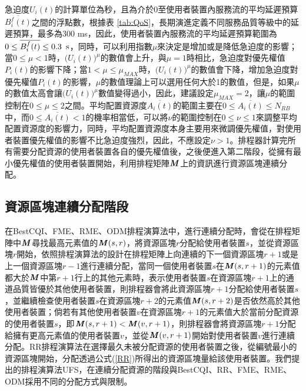急迫度$U_i(t)$的計算單位為秒，且為介於0至使用者裝置內服務流的平均延遲預算$\overline{B_i^f(t)}$之間的浮點數，根據表 \ref{tab:QoS}，長期演進定義不同服務品質等級中的延遲預算，最多為300 ms，因此，使用者裝置內服務流的平均延遲預算範圍為$0 \leq \overline{B_i^f(t)} \leq 0.3\enskip\text{s}$，同時，可以利用指數$\mu$來決定是增加或是降低急迫度的影響；當$0\leq\mu< 1$時，$\big(U_i(t)\big)^\mu$的數值會上升，與$\mu=1$時相比，急迫度對優先權值$P_i(t)$的影響下降；當$1<\mu\leq \mu_{MAX}$時，$\big(U_i(t)\big)^\mu$的數值會下降，增加急迫度對優先權值$P_i(t)$的影響，$\mu$的數值理論上可以選用任何大於1的數值，但是，如果$\mu$的數值太高會讓$\big(U_i(t)\big)^\mu$數值變得過小，因此，建議設定$\mu_{MAX}=2$，讓$\mu$的範圍控制在$0\leq\mu\leq 2$之間。平均配置資源度$\overline{A_i(t)}$的範圍主要在$0\leq\overline{A_i(t)}\leq N_{RB}$中，而$0\leq\overline{A_i(t)}<1$的機率相當低，可以將$\nu$的範圍控制在$0\leq\nu\leq 1$來調整平均配置資源度的影響力，同時，平均配置資源度本身主要用來微調優先權值，對使用者裝置優先權值的影響不比急迫度強烈，因此，不應設定$\nu > 1$。排程器計算完所有需要分配資源的使用者裝置各自的優先權值後，之後便進入第二階段，從擁有最小優先權值的使用者裝置開始，利用排程矩陣$\textbf{\textit{M}}$上的資訊進行資源區塊連續分配。

\subsection{資源區塊連續分配階段}
在BestCQI、FME、RME、ODM排程演算法中，進行連續分配時，會從在排程矩陣中$\textbf{\textit{M}}$尋找最高元素值的$\textbf{\textit{M}}(s,r)$，將資源區塊$r$分配給使用者裝置$s$，並從資源區塊$r$開始，依照排程演算法的設計在排程矩陣上向連續的下一個資源區塊$r+1$或是上一個資源區塊$r-1$進行連續分配，當同一個使用者裝置$s$在$\textbf{\textit{M}}(s,r+1)$的元素值都大於$\textbf{\textit{M}}$中第$r+1$行上的其他元素時，表示使用者裝置$s$在資源區塊$r+1$上的通道品質皆優於其他使用者裝置，則排程器會將此資源區塊$r+1$分配給使用者裝置$s$，並繼續檢查使用者裝置$s$在資源區塊$r+2$的元素值$\textbf{\textit{M}}(s,r+2)$是否依然高於其他使用者裝置；倘若有其他使用者裝置$v$在資源區塊$r+1$的元素值大於當前分配資源的使用者裝置$s$，即$\textbf{\textit{M}}(s,r+1)<\textbf{\textit{M}}(v,r+1)$，則排程器會將資源區塊$r+1$分配給擁有更高元素值的使用者裝置$v$，並從$\textbf{\textit{M}}(v,r+1)$開始對使用者裝置$v$進行連續分配。RR排程演算法在選擇最久未被分配資源的使用者裝置之後，從編號最小的資源區塊開始，分配透過公式(\ref{RR})所得出的資源區塊量給該使用者裝置。我們提出的排程演算法UFS，在連續分配資源的階段與BestCQI、RR、FME、RME、ODM採用不同的分配方式與限制。

